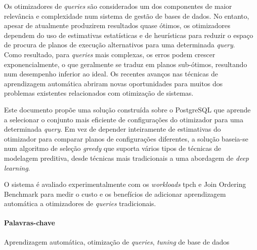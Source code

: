 Os otimizadores de \textit{queries} são considerados um dos componentes de maior relevância e complexidade num sistema de gestão de bases de dados. No entanto, apesar de atualmente produzirem resultados quase ótimos, os otimizadores dependem do uso de estimativas estatísticas e de heurísticas para reduzir o espaço de procura de planos de execução alternativos para uma determinada \textit{query}. Como resultado, para \textit{queries} mais complexas, os erros podem crescer exponencialmente, o que geralmente se traduz em planos sub-ótimos, resultando num desempenho inferior ao ideal. Os recentes avanços nas técnicas de aprendizagem automática abriram novas oportunidades para muitos dos problemas existentes relacionados com otimização de sistemas.

Este documento propõe uma solução construída sobre o PostgreSQL que aprende a selecionar o conjunto mais eficiente de configurações do otimizador para uma determinada \textit{query}. Em vez de depender inteiramente de estimativas do otimizador para comparar planos de configurações diferentes, a solução baseia-se num algoritmo de seleção \textit{greedy} que suporta vários tipos de técnicas de modelagem preditiva, desde técnicas mais tradicionais a uma abordagem de \textit{deep learning}.

O sistema é avaliado experimentalmente com os \textit{workloads} \gls{tpch} e Join Ordering Benchmark para medir o custo e os benefícios de adicionar aprendizagem automática a otimizadores de \textit{queries} tradicionais.

\paragraph{Palavras-chave} Aprendizagem automática, otimização de \textit{queries}, \textit{tuning} de base de dados